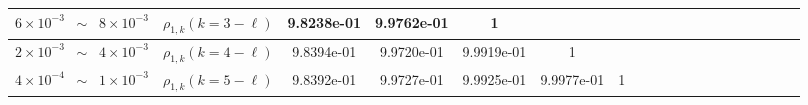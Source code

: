 \begin{table}[ht]
{\begin{tabular}{|c|c|c|c|c|c|c|c|c|c|c|c|c|c|c|c|c|c|c|}
\multirow{1}{*}{$6\times 10^{-3}\;\;\sim \;\;8\times 10^{-3}$}&\multicolumn{1}{|c|}{$\rho_{1,k} (k=3-\ell)$}&9.8238e-01&9.9762e-01&1&&&\\
\hline
\multirow{1}{*}{$2\times 10^{-3}\;\;\sim \;\;4\times 10^{-3}$}&\multicolumn{1}{|c|}{$\rho_{1,k} (k=4-\ell)$}&9.8394e-01&9.9720e-01 &9.9919e-01&1&&\\
\hline
\multirow{1}{*}{$4\times 10^{-4}\;\;\sim \;\;1\times 10^{-3}$} &\multicolumn{1}{|c|}{$\rho_{1,k} (k=5-\ell)$}&9.8392e-01 &9.9727e-01 &9.9925e-01 &9.9977e-01 &1 &\\
\hline

\end{tabular}}
\end{table}
